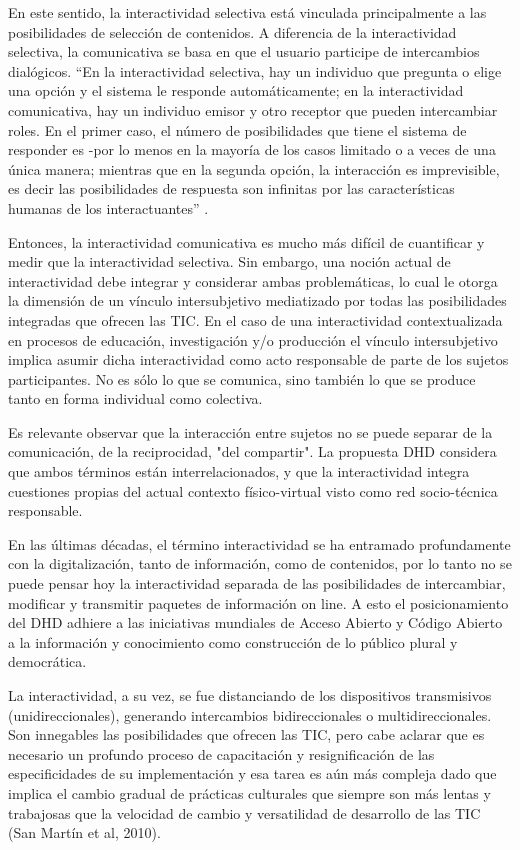 En este sentido, la interactividad selectiva está vinculada principalmente a las posibilidades de
selección de contenidos. A diferencia de la interactividad selectiva, la
comunicativa se basa en que el usuario participe de intercambios dialógicos. “En
la interactividad selectiva, hay un individuo que pregunta o elige una opción y
el sistema le responde automáticamente; en la interactividad comunicativa, hay
un individuo emisor y otro receptor que pueden intercambiar roles. En el primer
caso, el número de posibilidades que tiene el sistema de responder es -por lo
menos en la mayoría de los casos limitado o a veces de una única manera;
mientras que en la segunda opción, la interacción es imprevisible, es decir las
posibilidades de respuesta son infinitas por las características humanas de los
interactuantes” \cite{lxxiv}.

Entonces, la interactividad comunicativa es mucho más difícil de cuantificar y medir que la interactividad
selectiva. Sin embargo, una noción actual de interactividad debe integrar y considerar ambas problemáticas, lo cual le otorga la dimensión de un vínculo intersubjetivo mediatizado por todas las posibilidades integradas que ofrecen las TIC.
En el caso de una interactividad contextualizada en procesos de educación, investigación y/o producción el vínculo intersubjetivo implica asumir dicha interactividad como acto responsable de parte de los sujetos participantes. No es sólo lo que se comunica, sino también lo que se produce tanto en forma individual como colectiva.

Es relevante observar que la interacción entre sujetos no se
puede separar de la comunicación, de la reciprocidad, "del compartir". La propuesta DHD
considera que ambos términos están interrelacionados, y que la interactividad
integra cuestiones propias del actual contexto físico-virtual visto como red
socio-técnica responsable.

En las últimas décadas, el término interactividad se ha entramado profundamente con la
digitalización, tanto de información, como de contenidos, por lo tanto no se puede pensar hoy
la interactividad separada de las posibilidades de intercambiar, modificar y
transmitir paquetes de información on line. A esto el posicionamiento del DHD
adhiere a las iniciativas mundiales de Acceso Abierto y Código Abierto a la
información y conocimiento como construcción de lo público plural y democrática.

La interactividad, a su vez, se fue distanciando de los dispositivos
transmisivos (unidireccionales), generando intercambios bidireccionales o
multidireccionales. Son innegables las posibilidades que ofrecen las TIC, pero cabe aclarar que
es necesario un profundo proceso de capacitación y resignificación de las
especificidades de su implementación y esa tarea es aún más compleja dado que
implica el cambio gradual de prácticas culturales que siempre son más lentas y
trabajosas que la velocidad de cambio y versatilidad de desarrollo de las TIC
(San Martín et al, 2010).


